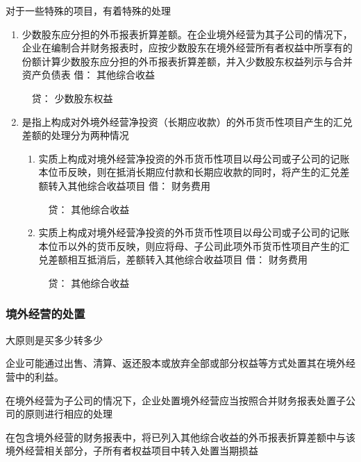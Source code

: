 \documentclass[UTF8,12pt]{ctexart}
\newenvironment{Dr}{\noindent 借：}{\par}
\newenvironment{Cr}{\noindent \ \ 贷：}{\par}
\numberwithin{equation}{section} %
\numberwithin{figure}{section}
\numberwithin{table}{section}
\begin{document}
	对于一些特殊的项目，有着特殊的处理
	\begin{enumerate}
		\item 少数股东应分担的外币报表折算差额。在企业境外经营为其子公司的情况下，企业在编制合并财务报表时，应按少数股东在境外经营所有者权益中所享有的份额计算少数股东应分担的外币报表折算差额，并入少数股东权益列示与合并资产负债表
		\begin{Dr}
			其他综合收益
		\end{Dr}
		\begin{Cr}
			少数股东权益
		\end{Cr}
		
		\item 是指上构成对外境外经营净投资（长期应收款）的外币货币性项目产生的汇兑差额的处理分为两种情况
		\begin{enumerate}
			\item 实质上构成对境外经营净投资的外币货币性项目以母公司或子公司的记账本位币反映，则在抵消长期应付款和长期应收款的同时，将产生的汇兑差额转入其他综合收益项目
			\begin{Dr}
				财务费用
			\end{Dr}
			\begin{Cr}
				其他综合收益
			\end{Cr}
			
			\item 实质上构成对境外经营净投资的外币货币性项目以母公司或子公司的记账本位币以外的货币反映，则应将母、子公司此项外币货币性项目产生的汇兑差额相互抵消后，差额转入其他综合收益项目
			\begin{Dr}
			财务费用
			\end{Dr}
			\begin{Cr}
			其他综合收益
			\end{Cr}
		\end{enumerate}
	\end{enumerate}
	
	\subsubsection{境外经营的处置}
	大原则是买多少转多少
	
	企业可能通过出售、清算、返还股本或放弃全部或部分权益等方式处置其在境外经营中的利益。
	
	在境外经营为子公司的情况下，企业处置境外经营应当按照合并财务报表处置子公司的原则进行相应的处理
	
	在包含境外经营的财务报表中，将已列入其他综合收益的外币报表折算差额中与该境外经营相关部分，子所有者权益项目中转入处置当期损益
	
\end{document}
